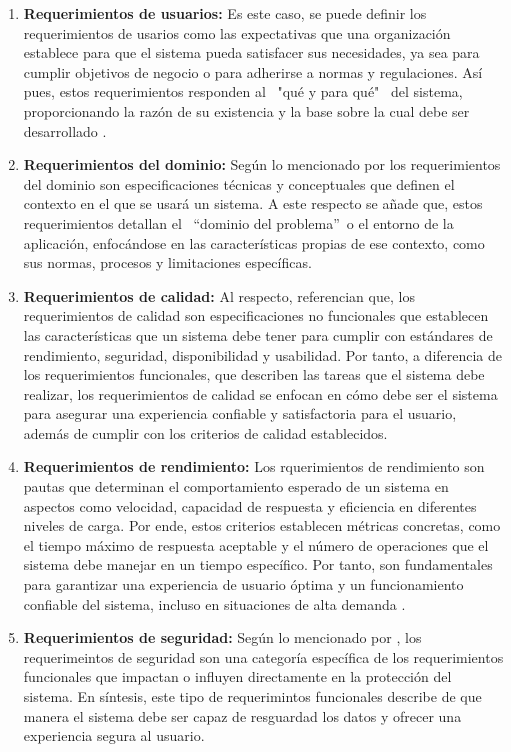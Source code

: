 \begin{enumerate}
    \item \textbf{Requerimientos de usuarios:} Es este caso, se puede definir los requerimientos de usarios como las expectativas que una organización establece para que el sistema pueda satisfacer sus necesidades, ya sea para cumplir objetivos de negocio o para adherirse a normas y regulaciones. Así pues, estos requerimientos responden al \ "qué y para qué" \ del sistema, proporcionando la razón de su existencia y la base sobre la cual debe ser desarrollado \parencite{qbdgroup}.
    \item \textbf{Requerimientos del dominio:} Según lo mencionado por \cite{bjørner2008} los requerimientos del dominio son especificaciones técnicas y conceptuales que definen el contexto en el que se usará un sistema. A este respecto se añade que, estos requerimientos detallan el \ “dominio del problema”\ o el entorno de la aplicación, enfocándose en las características propias de ese contexto, como sus normas, procesos y limitaciones específicas.
    \item \textbf{Requerimientos de calidad:} Al respecto, \cite{eckhardt2016An} referencian que, los requerimientos de calidad son especificaciones no funcionales que establecen las características que un sistema debe tener para cumplir con estándares de rendimiento, seguridad, disponibilidad y usabilidad. Por tanto, a diferencia de los requerimientos funcionales, que describen las tareas que el sistema debe realizar, los requerimientos de calidad se enfocan en cómo debe ser el sistema para asegurar una experiencia confiable y satisfactoria para el usuario, además de cumplir con los criterios de calidad establecidos.
    \item \textbf{Requerimientos de rendimiento:} Los rquerimientos de rendimiento son pautas que determinan el comportamiento esperado de un sistema en aspectos como velocidad, capacidad de respuesta y eficiencia en diferentes niveles de carga. Por ende, estos criterios establecen métricas concretas, como el tiempo máximo de respuesta aceptable y el número de operaciones que el sistema debe manejar en un tiempo específico. Por tanto, son fundamentales para garantizar una experiencia de usuario óptima y un funcionamiento confiable del sistema, incluso en situaciones de alta demanda \parencite{eckhardt2016challenging}.
    \item \textbf{Requerimientos de seguridad:} Según lo mencionado por \cite{espejel2019}, los requerimeintos de seguridad son una categoría específica de los requerimientos funcionales que impactan o influyen directamente en la protección del sistema. En síntesis, este tipo de requerimintos funcionales describe de que manera el sistema debe ser capaz de resguardad los datos y ofrecer una experiencia segura al usuario.

\end{enumerate}
